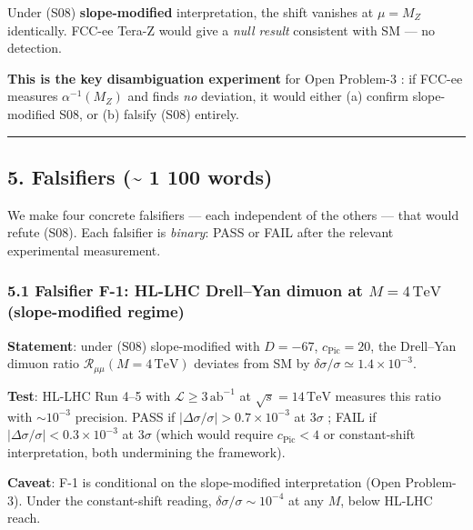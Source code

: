 \documentclass[
  11pt,
  a4paper,
]{article}
\begin{document}
Under (S08) \textbf{slope-modified} interpretation, the shift vanishes at \(\mu = M_Z\) identically. FCC-ee Tera-Z would give a \emph{null result} consistent with SM --- no detection.

\textbf{This is the key disambiguation experiment} for Open Problem-3 : if FCC-ee measures \(\alpha^{-1}(M_Z)\) and finds \emph{no} deviation, it would either (a) confirm slope-modified S08, or (b) falsify (S08) entirely.

\begin{center}\rule{0.5\linewidth}{0.5pt}\end{center}

\hypertarget{falsifiers-1-100-words}{%
\subsection{5. Falsifiers (\textasciitilde{} 1 100 words)}\label{falsifiers-1-100-words}}

We make four concrete falsifiers --- each independent of the others --- that would refute (S08). Each falsifier is \emph{binary}: PASS or FAIL after the relevant experimental measurement.

\hypertarget{falsifier-f-1-hl-lhc-drellyan-dimuon-at-m-4mathrmtev-slope-modified-regime}{%
\subsubsection{\texorpdfstring{5.1 Falsifier F-1: HL-LHC Drell--Yan dimuon at \(M = 4\,\mathrm{TeV}\) (slope-modified regime)}{5.1 Falsifier F-1: HL-LHC Drell--Yan dimuon at M = 4\textbackslash,\textbackslash mathrm\{TeV\} (slope-modified regime)}}\label{falsifier-f-1-hl-lhc-drellyan-dimuon-at-m-4mathrmtev-slope-modified-regime}}

\textbf{Statement}: under (S08) slope-modified with \(D = -67\), \(c_{\mathrm{Pic}} = 20\), the Drell--Yan dimuon ratio \(\mathcal R_{\mu\mu}(M = 4\,\mathrm{TeV})\) deviates from SM by \(\delta\sigma/\sigma \simeq 1.4 \times 10^{-3}\).

\textbf{Test}: HL-LHC Run 4--5 with \(\mathcal L \ge 3\,\mathrm{ab}^{-1}\) at \(\sqrt s = 14\,\mathrm{TeV}\) measures this ratio with \(\sim 10^{-3}\) precision. PASS if \(|\Delta\sigma/\sigma| > 0.7 \times 10^{-3}\) at \(3\sigma\) ; FAIL if \(|\Delta\sigma/\sigma| < 0.3 \times 10^{-3}\) at \(3\sigma\) (which would require \(c_{\mathrm{Pic}} < 4\) or constant-shift interpretation, both undermining the framework).

\textbf{Caveat}: F-1 is conditional on the slope-modified interpretation (Open Problem-3). Under the constant-shift reading, \(\delta\sigma/\sigma \sim 10^{-4}\) at any \(M\), below HL-LHC reach.
\end{document}
